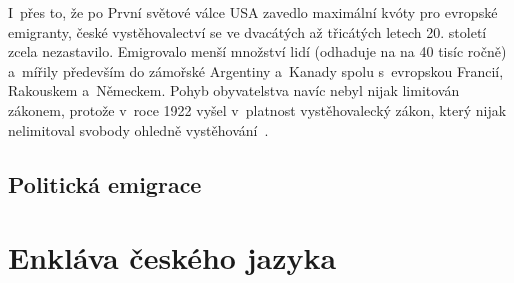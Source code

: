 I~přes to, že po První světové válce USA zavedlo maximální kvóty pro evropské emigranty, české vystěhovalectví se ve dvacátých až třicátých letech 20. století zcela nezastavilo. Emigrovalo menší množství lidí (odhaduje na na 40 tisíc ročně) a~mířily především do zámořské Argentiny a~Kanady spolu s~evropskou Francií, Rakouskem a~Německem. Pohyb obyvatelstva navíc nebyl nijak limitován zákonem, protože v~roce 1922 vyšel v~platnost vystěhovalecký zákon, který nijak nelimitoval svobody ohledně vystěhování~\parencite{Vaculik2009b}.

\hypertarget{politickuxe1-emigrace}{%
\subsection{Politická emigrace}\label{politickuxe1-emigrace}}

\hypertarget{enkluxe1va-ux10deskuxe9ho-jazyka}{%
\section{Enkláva českého jazyka}\label{enkluxe1va-ux10deskuxe9ho-jazyka}}
